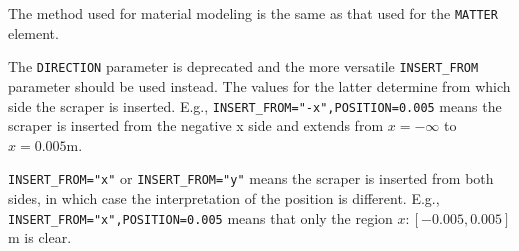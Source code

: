 The method used for material modeling is the same as that used for the \verb|MATTER| element.

The \verb|DIRECTION| parameter is deprecated and the more versatile \verb|INSERT_FROM| parameter
should be used instead.
The values for the latter determine from which side the scraper is inserted.
E.g., \verb|INSERT_FROM="-x",POSITION=0.005| means the scraper is inserted from the negative x side
and extends from $x=-\infty$ to $x=0.005$m.

\verb|INSERT_FROM="x"| or \verb|INSERT_FROM="y"| means the scraper is inserted from both sides, in which case the interpretation
of the position is different. 
E.g., \verb|INSERT_FROM="x",POSITION=0.005| means that only the region $x:[-0.005, 0.005]$m is clear.
